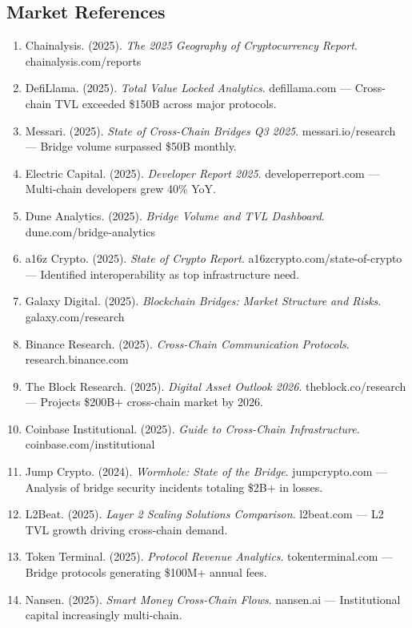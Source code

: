 \documentclass[12pt,a4paper]{article}
\begin{document}
\subsection{Market References}

\begin{enumerate}
    \item Chainalysis. (2025). \textit{The 2025 Geography of Cryptocurrency Report}. chainalysis.com/reports

    \item DefiLlama. (2025). \textit{Total Value Locked Analytics}. defillama.com --- Cross-chain TVL exceeded \$150B across major protocols.

    \item Messari. (2025). \textit{State of Cross-Chain Bridges Q3 2025}. messari.io/research --- Bridge volume surpassed \$50B monthly.

    \item Electric Capital. (2025). \textit{Developer Report 2025}. developerreport.com --- Multi-chain developers grew 40\% YoY.

    \item Dune Analytics. (2025). \textit{Bridge Volume and TVL Dashboard}. dune.com/bridge-analytics

    \item a16z Crypto. (2025). \textit{State of Crypto Report}. a16zcrypto.com/state-of-crypto --- Identified interoperability as top infrastructure need.

    \item Galaxy Digital. (2025). \textit{Blockchain Bridges: Market Structure and Risks}. galaxy.com/research

    \item Binance Research. (2025). \textit{Cross-Chain Communication Protocols}. research.binance.com

    \item The Block Research. (2025). \textit{Digital Asset Outlook 2026}. theblock.co/research --- Projects \$200B+ cross-chain market by 2026.

    \item Coinbase Institutional. (2025). \textit{Guide to Cross-Chain Infrastructure}. coinbase.com/institutional

    \item Jump Crypto. (2024). \textit{Wormhole: State of the Bridge}. jumpcrypto.com --- Analysis of bridge security incidents totaling \$2B+ in losses.

    \item L2Beat. (2025). \textit{Layer 2 Scaling Solutions Comparison}. l2beat.com --- L2 TVL growth driving cross-chain demand.

    \item Token Terminal. (2025). \textit{Protocol Revenue Analytics}. tokenterminal.com --- Bridge protocols generating \$100M+ annual fees.

    \item Nansen. (2025). \textit{Smart Money Cross-Chain Flows}. nansen.ai --- Institutional capital increasingly multi-chain.
\end{enumerate}
\end{document}
